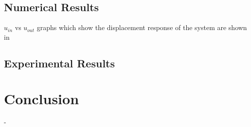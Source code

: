 \documentclass{IEEEtran}
\begin{document}
    \subsection{Numerical Results}
    $u_{in}$ vs $u_{out}$ graphs which show the displacement response of the system are shown in 
	
    \subsection{Experimental Results}
    


	\section{Conclusion}

 -
	
	\newpage
    \printbibliography
	
\end{document}
